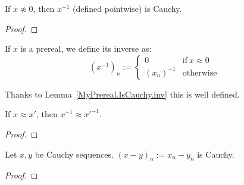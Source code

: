 \begin{lemma}
    \label{MyPrereal.IsCauchy.inv}
    \leanok
    If $x \not\approx 0$, then $x^{-1}$ (defined pointwise) is Cauchy.
\end{lemma}
\begin{proof}
    \leanok
\end{proof}

\begin{definition}
    \label{MyPrereal.inv}
    \leanok
    If $x$ is a prereal, we define its inverse as:
    \[
      (x^{-1})_n := \begin{cases}
          0 & \text{if}\ x \approx 0 \\
          (x_n)^{-1} & \text{otherwise}
      \end{cases}
    \]

    Thanks to Lemma~\ref{MyPrereal.IsCauchy.inv} this is well defined.
\end{definition}

\begin{lemma}
    \label{MyPrereal.inv_quotient}
    \leanok
    If $x \approx x'$, then $x^{-1} \approx x'^{-1}$.
\end{lemma}
\begin{proof}
    \leanok
\end{proof}

\begin{lemma}
    \label{MyPrereal.IsCauchy.sub}
    \leanok
    Let $x,y$ be Cauchy sequences.
    $(x - y)_n := x_n - y_n$ is Cauchy.
\end{lemma}
\begin{proof}
    \leanok
\end{proof}



